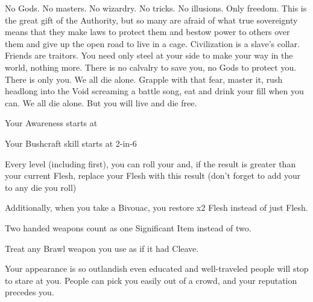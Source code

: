 {  

  No Gods.  No masters.  No wizardry.  No tricks.  No illusions.  Only freedom.  This is the great gift of the Authority, but so many are afraid of what true sovereignty means that they make laws to protect them and bestow power to others over them and give up the open road to live in a cage.  Civilization is a slave's collar.  Friends are traitors.  You need only steel at your side to make your way in the world, nothing more.  There is no calvalry to save you, no Gods to protect you.  There is only you.  We all die alone.  Grapple with that fear, master it, rush headlong into the Void screaming a battle song, eat and drink your fill when you can.  We all die alone.  But you will live and die free.



  Your Awareness starts at \DCUP

  Your Bushcraft skill starts at 2-in-6

  Every level (including first), you can roll your \VIG and, if the result is greater than your current Flesh, replace your Flesh with this result (don't forget to add your \LVL to any \VIG die you roll)

  Additionally, when you take a Bivouac, you restore \LVL x2 Flesh instead of just \LVL Flesh.

  \cbreak


  Two handed weapons count as one Significant Item instead of two.

  Treat any Brawl weapon you use as if it had Cleave.

  Your appearance is so outlandish even educated and well-traveled people will stop to stare at you. People can pick you easily out of a crowd, and your reputation precedes you.

}
